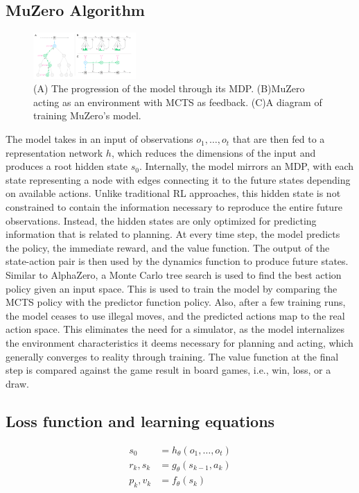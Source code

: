 \subsection{MuZero Algorithm}
\begin{figure}[h!]
    \centering
    \includegraphics[width=0.35\textwidth]{sections/6MuZero/graph_1.png}
    \caption{(A) The progression of the model through its MDP. (B)MuZero acting as an environment with MCTS as feedback. (C)A diagram of training MuZero's model.}
    \label{fig_1}
\end{figure}
The model takes in an input of observations $o_1, \ldots, o_t$ that are then fed to a representation network $h$,
which reduces the dimensions of the input and produces a root hidden state $s_0$. Internally, the model
mirrors an MDP, with each state representing a node with edges connecting it to the future states
depending on available actions. Unlike traditional RL approaches, this hidden state is not constrained to
contain the information necessary to reproduce the entire future observations. Instead, the hidden states
are only optimized for predicting information that is related to planning. At every time step, the model
predicts the policy, the immediate reward, and the value function. The output of the state-action pair is
then used by the dynamics function to produce future states. Similar to AlphaZero, a Monte Carlo tree
search is used to find the best action policy given an input space. This is used to train the model by
comparing the MCTS policy with the predictor function policy. Also, after a few training runs, the model
ceases to use illegal moves, and the predicted actions map to the real action space. This eliminates the
need for a simulator, as the model internalizes the environment characteristics it deems necessary for
planning and acting, which generally converges to reality through training. The value function at
the final step is compared against the game result in board games, i.e., win, loss, or a draw.

\subsection{Loss function and learning equations}

\begin{align}
    s_0      & = h_\theta(o_1, \ldots, o_t) \\
    r_k, s_k & = g_\theta(s_{k-1}, a_k)     \\
    p_k, v_k & = f_\theta(s_k)
\end{align}

